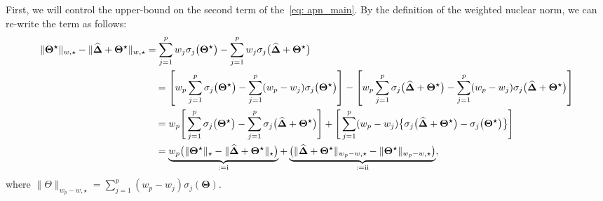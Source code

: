 \documentclass[alpha-refs]{wiley-article}
\newcommand{\RN}[1]{ \textup{\uppercase\expandafter{\romannumeral#1}} }
\begin{document}
First, we will control the upper-bound on the second term of the~\eqref{eq: apn_main}.
By the definition of the weighted nuclear norm, we can re-write the term as follows:
\begin{align}
    \|\boldsymbol{\Theta^{\star}}\|_{w,\star} - \|\boldsymbol{\widehat{\Delta}} + \boldsymbol{\Theta^{\star}}\|_{w,\star}
    &= \sum^{p}_{j = 1} w_{j}\sigma_{j}\big(\boldsymbol{\Theta^{\star}}\big) - \sum^{p}_{j = 1} w_{j}\sigma_{j}\big(\boldsymbol{\widehat{\Delta}} + \boldsymbol{\Theta^{\star}}\big)  \nonumber \\
    & \quad = \left[w_{p}\sum^{p}_{j = 1}\sigma_{j}\big(\boldsymbol{\Theta^{\star}}\big) - \sum^{p}_{j = 1}(w_{p} - w_{j})\sigma_{j}\big(\boldsymbol{\Theta^{\star}}\big)\right] - \left[w_{p}\sum^{p}_{j = 1}\sigma_{j}\big(\boldsymbol{\widehat{\Delta}} + \boldsymbol{\Theta^{\star}}\big) - \sum^{p}_{j = 1}(w_{p} - w_{j})\sigma_{j}\big(\boldsymbol{\widehat{\Delta}} + \boldsymbol{\Theta^{\star}}\big)\right] \nonumber \\
    & \quad = w_{p}\Bigg[ \sum^{p}_{j = 1}\sigma_{j}\big(\boldsymbol{\Theta^{\star}}\big) - \sum^{p}_{j = 1}\sigma_{j}\big(\boldsymbol{\widehat{\Delta}} + \boldsymbol{\Theta^{\star}}\big) \Bigg] + \Bigg[ \sum^{p}_{j=1}(w_{p} - w_{j})\big\{ \sigma_{j}\big(\boldsymbol{\widehat{\Delta}} + \boldsymbol{\Theta^{\star}}\big)-\sigma_{j}\big(\boldsymbol{\Theta^{\star}}\big)\big\}\Bigg] \nonumber\\
    & \quad = \underbrace{w_{p}\big( \|\boldsymbol{\Theta^{\star}}\|_{\star} - \|\boldsymbol{\widehat{\Delta}} + \boldsymbol{\Theta^{\star}}\|_{\star} \big)}_{:=\RN{1}} + \underbrace{\big( \|\boldsymbol{\widehat{\Delta}} + \boldsymbol{\Theta^{\star}}\|_{w_{p}-w,\star} - \|\boldsymbol{\Theta^{\star}}\|_{w_{p}-w,\star}\big)}_{:=\RN{2}}, \label{eq: wnn_diff}
\end{align}
where $\|\Theta\|_{w_{p} - w, \star} = \sum^{p}_{j = 1} (w_{p} - w_{j})\sigma_{j}(\boldsymbol{\Theta})$.
\end{document}

